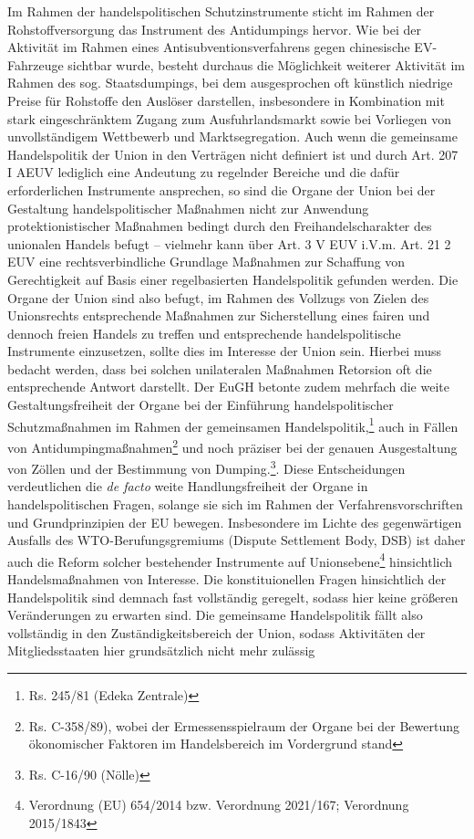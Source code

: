 \documentclass[12pt,a4paper,oneside]{book} %
\begin{document}
	Im Rahmen der handelspolitischen Schutzinstrumente sticht im Rahmen der Rohstoffversorgung das Instrument des Antidumpings hervor. 
	Wie bei der Aktivität im Rahmen eines Antisubventionsverfahrens gegen chinesische EV-Fahrzeuge sichtbar wurde, besteht durchaus die Möglichkeit weiterer Aktivität im Rahmen des sog. \glqq Staatsdumpings\grqq, bei dem ausgesprochen oft künstlich niedrige Preise für Rohstoffe den Auslöser darstellen, insbesondere in Kombination mit stark eingeschränktem Zugang zum Ausfuhrlandsmarkt sowie bei Vorliegen von unvollständigem Wettbewerb und Marktsegregation.\autocite{Hoffmesiter, Hrenzler/Herrmann/Niestedt, EU Außenwirtschaftrecht, VII 70 Rn14ff} Auch wenn die gemeinsame Handelspolitik der Union in den Verträgen nicht definiert ist und durch Art. 207 I AEUV lediglich eine Andeutung zu regelnder Bereiche und die dafür erforderlichen Instrumente ansprechen, so sind die Organe der Union bei der Gestaltung handelspolitischer Maßnahmen nicht zur Anwendung protektionistischer Maßnahmen bedingt durch den Freihandelscharakter des unionalen Handels befugt -- vielmehr kann über Art. 3 V EUV i.V.m. Art. 21 2 EUV eine rechtsverbindliche Grundlage Maßnahmen zur Schaffung von Gerechtigkeit auf Basis einer regelbasierten Handelspolitik gefunden werden.\autocite{Paschke, RdTW 2024, 216.} Die Organe der Union sind also befugt, im Rahmen des Vollzugs von Zielen des Unionsrechts entsprechende Maßnahmen zur Sicherstellung eines fairen und dennoch freien Handels zu treffen und entsprechende handelspolitische Instrumente einzusetzen, sollte dies im Interesse der Union sein.\autocite{Paschke, RdTW 2024, 206.; Callies/Ruffert Art 206 AEUV 8f; Grabitz Art. 206 AEUV Rn. 12} Hierbei muss bedacht werden, dass bei solchen unilateralen Maßnahmen Retorsion oft die entsprechende Antwort darstellt.\autocite{Altemöller, EuzW 2019, 321} Der EuGH betonte zudem mehrfach die weite Gestaltungsfreiheit der Organe bei der Einführung handelspolitischer Schutzmaßnahmen im Rahmen der gemeinsamen Handelspolitik,\footnote{Rs. 245/81 (Edeka Zentrale)} auch in Fällen von Antidumpingmaßnahmen\footnote{Rs. C-358/89), wobei der Ermessensspielraum der Organe bei der Bewertung ökonomischer Faktoren im Handelsbereich im Vordergrund stand} und noch präziser bei der genauen Ausgestaltung von Zöllen und der Bestimmung von \glqq Dumping\grqq.\footnote{Rs. C-16/90 (Nölle)}. Diese Entscheidungen verdeutlichen die \textit{de facto} weite Handlungsfreiheit der Organe in handelspolitischen Fragen, solange sie sich im Rahmen der Verfahrensvorschriften und Grundprinzipien der EU bewegen. Insbesondere im Lichte des gegenwärtigen Ausfalls des WTO-Berufungsgremiums (Dispute Settlement Body, DSB) ist daher auch die Reform solcher bestehender Instrumente auf Unionsebene\footnote{Verordnung (EU) 654/2014 bzw. Verordnung 2021/167; Verordnung 2015/1843} hinsichtlich Handelsmaßnahmen von Interesse.\autocite{Schäffer, EuZW 2023, 695, 698} Die konstituionellen Fragen hinsichtlich der Handelspolitik sind demnach fast vollständig geregelt, sodass hier keine größeren Veränderungen zu erwarten sind.\autocite{Müller-Ibold/Herrmann, EuZW 2022, 1029, 1030} Die gemeinsame Handelspolitik fällt also vollständig in den Zuständigkeitsbereich der Union, sodass Aktivitäten der Mitgliedsstaaten hier grundsätzlich nicht mehr zulässig 
\end{document}

